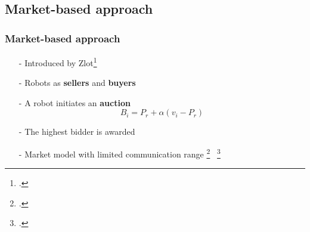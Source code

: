 \subsection{Market-based approach}
\begin{frame}
	\frametitle{Market-based approach}
	\begin{itemize}
		\item[-] Introduced by Zlot\footcite{Zlot2002}
		\item[-] Robots as \textbf{sellers} and \textbf{buyers}
		\item[-] A robot initiates an \textbf{auction}
		\begin{equation}
			B_{i} = P_{r} + \alpha(v_{i} - P_{r})
		\end{equation}
		\item[-] The highest bidder is awarded 		
		\item[-] Market model with limited communication range \footcite{Sheng2006} $\,$ \footcite{Michael2008}
		
%		
		\end{itemize}
	
\end{frame}

